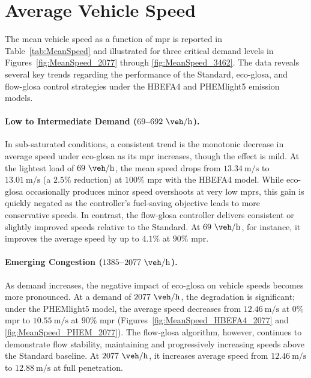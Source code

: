 \section{Average Vehicle Speed}
\label{sec:Results_MeanSpeed}

The mean vehicle speed as a function of \ac{mpr} is reported in Table~\vref{tab:MeanSpeed} and illustrated for three critical demand levels in Figures~\vref{fig:MeanSpeed_2077} through \vref{fig:MeanSpeed_3462}. The data reveals several key trends regarding the performance of the Standard, \ac{eco-glosa}, and \ac{flow-glosa} control strategies under the HBEFA4 and PHEMlight5 emission models.

\paragraph{Low to Intermediate Demand ($69$--$692~\unit{\veh\per\hour}$).}
In sub-saturated conditions, a consistent trend is the monotonic decrease in average speed under \ac{eco-glosa} as its \ac{mpr} increases, though the effect is mild. At the lightest load of $69~\unit{\veh\per\hour}$, the mean speed drops from $13.34~\unit{\metre\per\second}$ to $13.01~\unit{\metre\per\second}$ (a $2.5\%$ reduction) at $100\%$ \ac{mpr} with the HBEFA4 model. While \ac{eco-glosa} occasionally produces minor speed overshoots at very low \acp{mpr}, this gain is quickly negated as the controller's fuel-saving objective leads to more conservative speeds. In contrast, the \ac{flow-glosa} controller delivers consistent or slightly improved speeds relative to the Standard. At $69~\unit{\veh\per\hour}$, for instance, it improves the average speed by up to $4.1\%$ at $90\%$ \ac{mpr}.

\paragraph{Emerging Congestion ($1385$--$2077~\unit{\veh\per\hour}$).}
As demand increases, the negative impact of \ac{eco-glosa} on vehicle speeds becomes more pronounced. At a demand of $2077~\unit{\veh\per\hour}$, the degradation is significant; under the PHEMlight5 model, the average speed decreases from $12.46~\unit{\metre\per\second}$ at $0\%$ \ac{mpr} to $10.55~\unit{\metre\per\second}$ at $90\%$ \ac{mpr} (Figures~\vref{fig:MeanSpeed_HBEFA4_2077} and \vref{fig:MeanSpeed_PHEM_2077}). The \ac{flow-glosa} algorithm, however, continues to demonstrate flow stability, maintaining and progressively increasing speeds above the Standard baseline. At $2077~\unit{\veh\per\hour}$, it increases average speed from $12.46~\unit{\metre\per\second}$ to $12.88~\unit{\metre\per\second}$ at full penetration.

